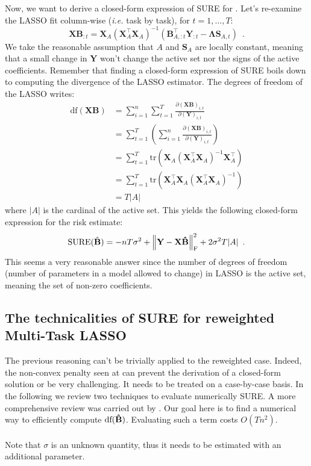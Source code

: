 \documentclass[a4paper,10pt]{article}
\theoremstyle{definition}
\begin{document}
Now, we want to derive a closed-form expression of SURE for . Let's re-examine the LASSO fit column-wise (\textit{i.e.} task by task), for $t=1, \dots, T$:
%
\begin{equation*}
    \mathbf{X B}_{:t}
    = \mathbf{X}_A(\mathbf{X}_A^{\top}\mathbf{X}_A)^{-1}
    (\mathbf{B}^{\top}_{A, :t}\mathbf{Y}_{:t} - \mathbf{\Lambda}\mathbf{S}_{A, t})
    \enspace .
\end{equation*}
%
We take the reasonable assumption that $A$ and $\mathbf{S}_A$ are locally constant, meaning that a small change in $\mathbf{Y}$ won't change the active set nor the signs of the active
coefficients. Remember that finding a closed-form expression of SURE boils down to computing the divergence of the LASSO estimator.
The degrees of freedom of the LASSO writes:
%
\begin{align*}
    \text{df}(\mathbf{XB})
    &= \sum_{i=1}^n \sum_{t=1}^T \frac{\partial (\mathbf{XB})_{i,t}}{\partial (\mathbf{Y})_{i, t}} \\
    &= \sum_{t=1}^T \left ( \sum_{i=1}^n \frac{\partial (\mathbf{XB})_{i,t}}{\partial (\mathbf{Y})_{i, t}} \right ) \\
    &= \sum_{t=1}^T \text{tr}(\mathbf{X}_A (\mathbf{X}_A^{\top} \mathbf{X}_A)^{-1}\mathbf{X}_A^{\top}) \\
    &= \sum_{t=1}^T \text{tr}(\mathbf{X}_A^{\top}\mathbf{X}_A (\mathbf{X}_A^{\top} \mathbf{X}_A)^{-1}) \\
    &= T \lvert A \rvert
\end{align*}
%
where $\lvert A \rvert$ is the cardinal of the active set. This yields the following closed-form expression for the risk estimate:
%
\begin{equation*}
    \text{SURE}(\hat{\bf{B}}) =
    - n T \sigma^2
    + \left \lVert \mathbf{Y} - \mathbf{X \hat{B}} \right \rVert^2_{\text{F}}
    + 2 \sigma^2 T \lvert A \rvert
    \enspace .
\end{equation*}
%
This seems a very reasonable answer since the number of degrees of freedom (number of parameters in a model allowed to change) in LASSO is the active set, meaning the set of non-zero
coefficients.

\subsection*{The technicalities of SURE for reweighted Multi-Task LASSO}

The previous reasoning can't be trivially applied to the reweighted case. Indeed, the non-convex penalty seen at  can prevent
the derivation of a closed-form solution or be very challenging. It needs to be treated on a case-by-case basis. In the following we review two
techniques to evaluate numerically SURE. A more comprehensive review was carried out by \cite{Deledalle_Vaiter_Fadili_Peyre14}. Our goal here is
to find a numerical way to efficiently compute $\text{df}(\bf\hat{B})$. Evaluating such a term costs $O(Tn^2)$.
\\
\\
Note that $\sigma$ is an unknown quantity, thus it needs to be estimated with an additional parameter.
%
\end{document}
